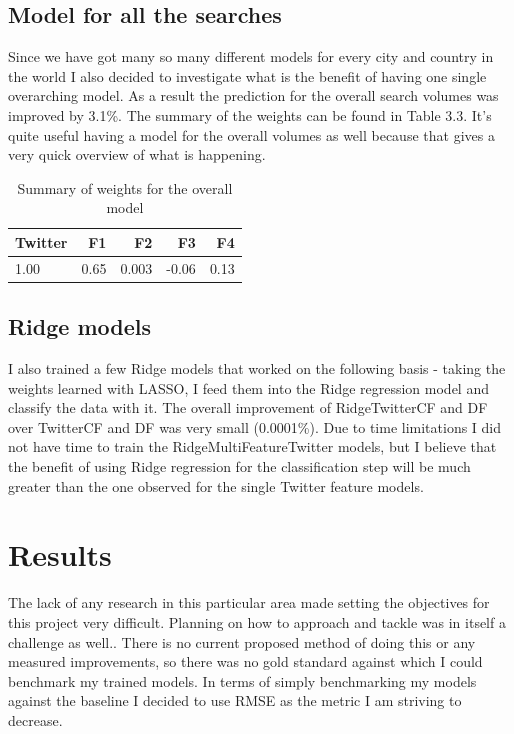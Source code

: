 \documentclass[minf,twoside,singlespacing,parskip,frontabs,notimes,11pt]{infthesis}
\begin{document}
\section{Model for all the searches}

Since we have got many so many different models for every city and country in the world I also decided to investigate what is the benefit of having one single overarching model. As a result the prediction for the overall search volumes was improved by 3.1\%. The summary of the weights can be found in Table 3.3. It's quite useful having a model for the overall volumes as well because that gives a very quick overview of what is happening. 

\begin{table}[h]
\begin{center}
\begin{tabular}{ l | r | r | r | r }
Twitter & F1 & F2 & F3 & F4 \\
\hline
1.00 & 0.65 & 0.003 & -0.06 & 0.13 \\
\end{tabular}
\end{center}
\caption{Summary of weights for the overall model}
\end{table}


\newpage
\section{Ridge models}

I also trained a few Ridge models that worked on the following basis - taking the weights learned with LASSO, I feed them into the Ridge regression model and classify the data with it. The overall improvement of RidgeTwitterCF and DF over TwitterCF and DF was very small (0.0001\%). Due to time limitations I did not have time to train the RidgeMultiFeatureTwitter models, but I believe that the benefit of using Ridge regression for the classification step will be much greater than the one observed for the single Twitter feature models. 


\chapter{Results}
\label{chap:results}


The lack of any research in this particular area made setting the objectives for this project very difficult. Planning on how to approach and tackle was in itself a challenge as well.. There is no current proposed method of doing this or any measured improvements, so there was no gold standard against which I could benchmark my trained models. In terms of simply benchmarking my models against the baseline I decided to use RMSE as the metric I am striving to decrease.
\end{document}
